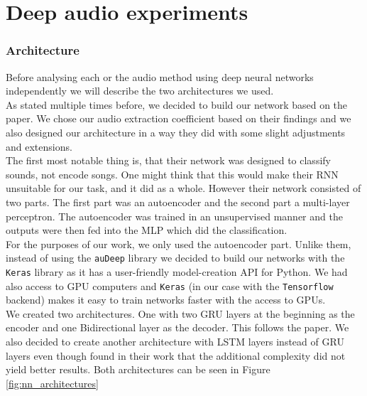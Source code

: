 \section{Deep audio experiments}

\subsubsection{Architecture}
Before analysing each or the audio method using deep neural networks independently we will describe the two architectures we used. \\
As stated multiple times before, we decided to build our network based on the \cite{inproceedings_RNNs} paper. We chose our audio extraction coefficient based on their findings and we also designed our architecture in a way they did with some slight adjustments and extensions. \\
The first most notable thing is, that their network was designed to classify sounds, not encode songs. One might think that this would make their RNN unsuitable for our task, and it did as a whole. However their network consisted of two parts. The first part was an autoencoder and the second part a multi-layer perceptron. The autoencoder was trained in an unsupervised manner and the outputs were then fed into the MLP which did the classification. \\
For the purposes of our work, we only used the autoencoder part. Unlike them, instead of using the \texttt{auDeep} library we decided to build our networks with the \texttt{Keras} library \cite{chollet2015keras} as it has a user-friendly model-creation API for Python. We had also access to GPU computers and \texttt{Keras} (in our case with the \texttt{Tensorflow} backend) makes it easy to train networks faster with the access to GPUs. \\
We created two architectures. One with two GRU layers at the beginning as the encoder and one Bidirectional layer as the decoder. This follows the paper. We also decided to create another architecture with LSTM layers instead of GRU layers even though \citeauthor{inproceedings_RNNs} found in their work that the additional complexity did not yield better results. Both architectures can be seen in Figure \ref{fig:nn_architectures} \\

